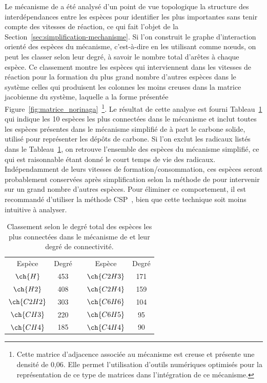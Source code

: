 Le mécanisme de \citet{Norinaga2009} a été analysé d'un point de vue topologique \textendash{} la structure des interdépendances entre les espèces \textendash{} pour identifier les plus importantes sans tenir compte des vitesses de réaction, ce qui fait l'objet de la Section~\ref{sec:simplification-mechanisme}. Si l'on construit le graphe d'interaction orienté des espèces du mécanisme, c'est-à-dire en les utilisant comme n{\oe}uds, on peut les classer selon leur degré, à savoir le nombre total d'arêtes à chaque espèce. Ce classement montre les espèces qui interviennent dans les vitesses de réaction pour la formation du plus grand nombre d'autres espèces dans le système \textendash{} celles qui produisent les colonnes les moins creuses dans la matrice jacobienne du système, laquelle a la forme présentée Figure~\ref{fig:matrice_norinaga}~\footnote{Cette matrice d'adjacence associée au mécanisme est creuse et présente une densité de 0,06. Elle permet l'utilisation d'outils numériques optimisés pour la représentation de ce type de matrices dans l'intégration de ce mécanisme.}. Le résultat de cette analyse est fourni Tableau~\ref{tab:graphe_non_dirige} qui indique les 10 espèces les plus connectées dans le mécanisme et inclut toutes les espèces présentes dans le mécanisme simplifié de \citet{Graf2007} à part le carbone solide, utilisé pour représenter les dépôts de carbone. Si l'on exclut les radicaux listés dans le Tableau~\ref{tab:graphe_non_dirige}, on retrouve l'ensemble des espèces du mécanisme simplifié, ce qui est raisonnable étant donné le court temps de vie des radicaux. Indépendamment de leurs vitesses de formation/consommation, ces espèces seront probablement conservées après simplification selon la méthode de \citet{Lu2005} pour intervenir sur un grand nombre d'autres espèces. Pour éliminer ce comportement, il est recommandé d'utiliser la méthode CSP~\cite{Lam1993,Lam1994}, bien que cette technique soit moins intuitive à analyser.

\begin{table}[h]
  \caption{\label{tab:graphe_non_dirige}Classement selon le degré total des espèces les plus connectées dans le mécanisme de \citet{Norinaga2009} et leur degré de connectivité.}
  
  \centering{}\footnotesize{}%
  \begin{tabular}{ccccc}
    \cmidrule[2pt]{1-2} \cmidrule[2pt]{4-5} 
    Espèce      & Degré  &  & Espèce      & Degré \tabularnewline
    \cmidrule[2pt]{1-2} \cmidrule[2pt]{4-5} 
    $\ch{H}$    & 453    &  & $\ch{C2H3}$ & 171    \tabularnewline
    $\ch{H2}$   & 408    &  & $\ch{C2H4}$ & 159    \tabularnewline
    $\ch{C2H2}$ & 303    &  & $\ch{C6H6}$ & 104    \tabularnewline
    $\ch{CH3}$  & 220    &  & $\ch{C6H5}$ & 95     \tabularnewline
    $\ch{CH4}$  & 185    &  & $\ch{C4H4}$ & 90     \tabularnewline
    \cmidrule{1-2} \cmidrule{4-5} 
  \end{tabular}
\end{table}

